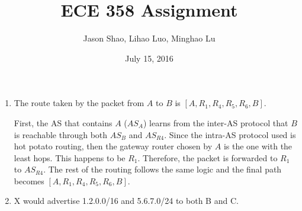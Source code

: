 \documentclass[12pt]{article}
\title{ECE 358 Assignment }
\author{Jason Shao, Lihao Luo, Minghao Lu}
\date{July 15, 2016}
\begin{document}
\maketitle
\renewcommand{\thesubsection}{Problem \arabic{subsection}}


\def\question#1{\item[\bf #1.]}
\def\part#1{\item[\bf #1)]}
\newcommand{\pc}[1]{\mbox{\textbf{#1}}} %

\begin{enumerate}
\item The route taken by the packet from $A$ to $B$ is $[A, R_1, R_4, R_5, R_6, B]$. 

First, the AS that contains $A$ ($AS_A$) learns from the inter-AS protocol that $B$ is reachable through both $AS_B$ and $AS_{R4}$. Since the intra-AS protocol used is hot potato routing, then the gateway router chosen by $A$ is the one with the least hops. This happens to be $R_1$. Therefore, the packet is forwarded to $R_1$ to $AS_{R4}$. The rest of the routing follows the same logic and the final path becomes $[A, R_1, R_4, R_5, R_6, B]$.

\item X would advertise 1.2.0.0/16 and 5.6.7.0/24 to both B and C.

\end{enumerate}
\end{document}

